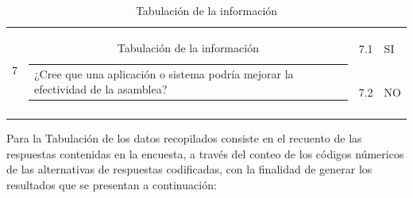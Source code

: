 \begin{longtable}{|l|l|l|l|}
		\hline
		\multirow{2}{*}{7}                          & \multirow{2}{*}{\begin{tabular}[c]{p{9cm}@{}l@{}}¿Cree que una aplicación o sistema podría mejorar la efectividad de la asamblea? \end{tabular}}                                               & 7.1              & SI                  \\ 
		\cline{3-4}
		&                                                                                                                                                                                            & 7.2              & NO                  \\
		\hline
		\caption{Tabulación de la información}
\end{longtable}


Para la Tabulación de los datos recopilados consiste en el recuento de las respuestas contenidas en la encuesta, a través del conteo de los códigos númericos de las alternativas de respuestas codificadas, con la finalidad de generar los resultados que se presentan a continuación:

\vspace{1cm}

